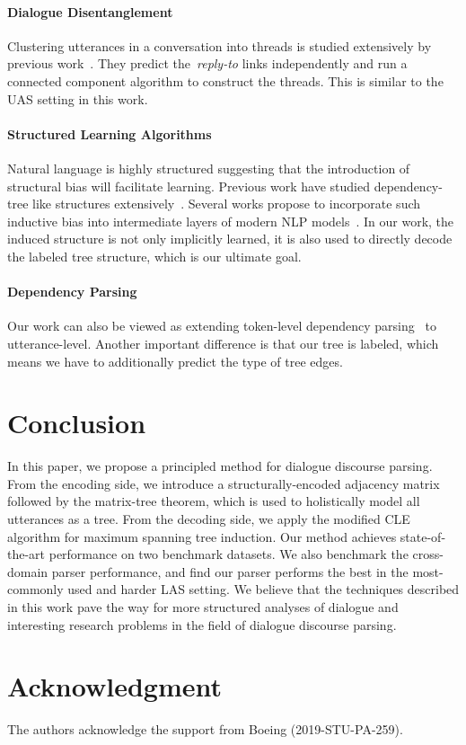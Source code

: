 \documentclass[11pt]{article}
\begin{document}
\paragraph{Dialogue Disentanglement}
Clustering utterances in a conversation into threads is studied extensively by previous work~\cite{shen2006thread,elsner2008you,wang2009context,elsner2011disentangling,jiang2018learning,kummerfeld2018large,zhu2020did,li2020dialbert,yu2020online}. 
They predict the~\emph{reply-to} links independently and run a connected component algorithm to construct the threads. This is similar to the UAS setting in this work.

\paragraph{Structured Learning Algorithms}
Natural language is highly structured suggesting that the introduction of structural bias will facilitate learning. Previous work have studied dependency-tree like structures extensively~\cite{koo2007structured,mcdonald2005non,mcdonald2007complexity,niculae2018sparsemap,paulus2020gradient}. Several works propose to incorporate such inductive bias into intermediate layers of modern NLP models~\cite{kim2017structured,chen2017improved,liu2018learning,choi2018learning}. In our work, the induced structure is not only implicitly learned, it is also used to directly decode the labeled tree structure, which is our ultimate goal.

\paragraph{Dependency Parsing}
Our work can also be viewed as extending token-level dependency parsing~\cite{mel1988dependency,koo2007structured,smith2008dependency,koo2010efficient,chen2014fast,dozat2016deep,qi2019universal,choi2011getting} to utterance-level. Another important difference is that our tree is labeled, which means we have to additionally predict the type of tree edges.

\section{Conclusion}
In this paper, we propose a principled method for dialogue discourse parsing. From the encoding side, we introduce a structurally-encoded adjacency matrix followed by the matrix-tree theorem, which is used to holistically model all utterances as a tree. From the decoding side, we apply the modified CLE algorithm for maximum spanning tree induction. Our method achieves state-of-the-art performance on two benchmark datasets. We also benchmark the cross-domain parser performance, and find our parser performs the best in the most-commonly used and harder LAS setting. We believe that the techniques described in this work pave the way for more structured analyses of dialogue and interesting research problems in the field of dialogue discourse parsing.

\section*{Acknowledgment}
The authors acknowledge the support from Boeing (2019-STU-PA-259).


\end{document}
